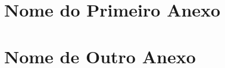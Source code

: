 
\begin{anexosenv}

\partanexos

\chapter{Nome do Primeiro Anexo}
\lipsum[30] %

\chapter{Nome de Outro Anexo}

\lipsum[32] %

\end{anexosenv}
